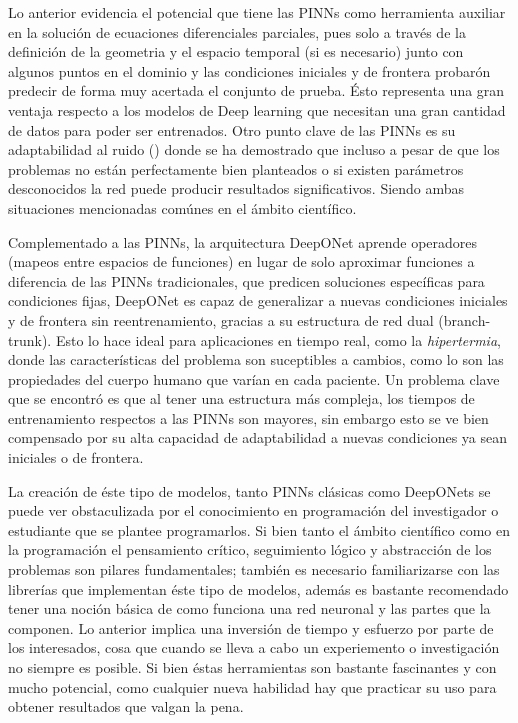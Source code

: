 \documentclass[
  spanish,
  us-letterpaper,
]{scrreprt}
\theoremstyle{plain}
\theoremstyle{definition}
\theoremstyle{remark}
\begin{document}
Lo anterior evidencia el potencial que tiene las PINNs como herramienta
auxiliar en la solución de ecuaciones diferenciales parciales, pues solo
a través de la definición de la geometria y el espacio temporal (si es
necesario) junto con algunos puntos en el dominio y las condiciones
iniciales y de frontera probarón predecir de forma muy acertada el
conjunto de prueba. Ésto representa una gran ventaja respecto a los
modelos de Deep learning que necesitan una gran cantidad de datos para
poder ser entrenados. Otro punto clave de las PINNs es su adaptabilidad
al ruido ()
donde se ha demostrado que incluso a pesar de que los problemas no están
perfectamente bien planteados o si existen parámetros desconocidos la
red puede producir resultados significativos. Siendo ambas situaciones
mencionadas comúnes en el ámbito científico.

Complementado a las PINNs, la arquitectura DeepONet aprende operadores
(mapeos entre espacios de funciones) en lugar de solo aproximar
funciones a diferencia de las PINNs tradicionales, que predicen
soluciones específicas para condiciones fijas, DeepONet es capaz de
generalizar a nuevas condiciones iniciales y de frontera sin
reentrenamiento, gracias a su estructura de red dual (branch-trunk).
Esto lo hace ideal para aplicaciones en tiempo real, como la
\emph{hipertermia}, donde las características del problema son
suceptibles a cambios, como lo son las propiedades del cuerpo humano que
varían en cada paciente. Un problema clave que se encontró es que al
tener una estructura más compleja, los tiempos de entrenamiento
respectos a las PINNs son mayores, sin embargo esto se ve bien
compensado por su alta capacidad de adaptabilidad a nuevas condiciones
ya sean iniciales o de frontera.

La creación de éste tipo de modelos, tanto PINNs clásicas como DeepONets
se puede ver obstaculizada por el conocimiento en programación del
investigador o estudiante que se plantee programarlos. Si bien tanto el
ámbito científico como en la programación el pensamiento crítico,
seguimiento lógico y abstracción de los problemas son pilares
fundamentales; también es necesario familiarizarse con las librerías que
implementan éste tipo de modelos, además es bastante recomendado tener
una noción básica de como funciona una red neuronal y las partes que la
componen. Lo anterior implica una inversión de tiempo y esfuerzo por
parte de los interesados, cosa que cuando se lleva a cabo un
experiemento o investigación no siempre es posible. Si bien éstas
herramientas son bastante fascinantes y con mucho potencial, como
cualquier nueva habilidad hay que practicar su uso para obtener
resultados que valgan la pena.
\end{document}
